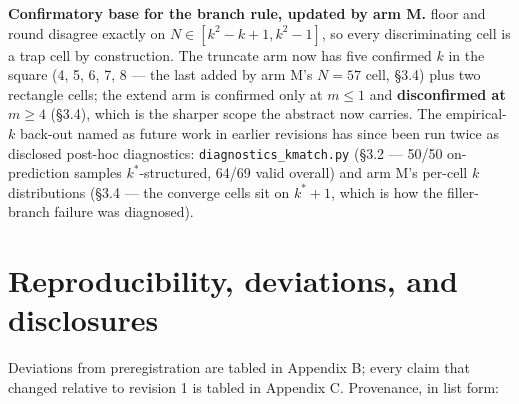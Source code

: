 \documentclass[11pt]{article}
\begin{document}
\textbf{Confirmatory base for the branch rule, updated by arm M.} floor and round disagree exactly
on $N \in [k^2-k+1, k^2-1]$, so every discriminating cell is a trap cell by construction. The
truncate arm now has five confirmed $k$ in the square (4, 5, 6, 7, 8 --- the last added by arm M's
$N = 57$ cell, \S3.4) plus two rectangle cells; the extend arm is confirmed only at $m \le 1$ and
\textbf{disconfirmed at $m \ge 4$} (\S3.4), which is the sharper scope the abstract now carries. The
empirical-$k$ back-out named as future work in earlier revisions has since been run twice as
disclosed post-hoc diagnostics: \texttt{diagnostics\_kmatch.py} (\S3.2 --- 50/50 on-prediction samples
$k^{*}$-structured, 64/69 valid overall) and arm M's per-cell $k$ distributions (\S3.4 --- the
converge cells sit on $k^{*}+1$, which is how the filler-branch failure was diagnosed).

\section{Reproducibility, deviations, and disclosures}

Deviations from preregistration are tabled in Appendix B; every claim that changed relative to
revision 1 is tabled in Appendix C. Provenance, in list form:
\end{document}
